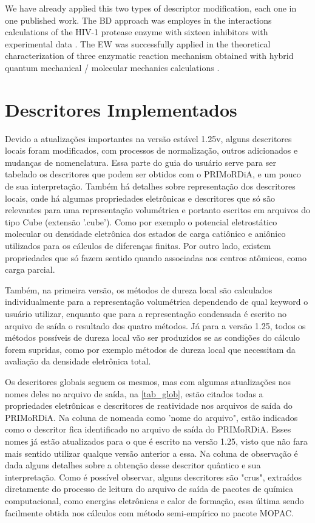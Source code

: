 \documentclass[a4paper,11pt]{refart}
\begin{document}
We have already applied this two types of descriptor modification, each one in one published work. The BD approach was employes in the interactions calculations of the HIV-1 protease enzyme with sixteen inhibitors with experimental data \cite{grillo2020semiempirical}. The EW was successfully applied in the theoretical characterization of three enzymatic reaction mechanism obtained with hybrid quantum mechanical / molecular mechanics calculations \cite{grillo2020elucidating}.

\section{Descritores Implementados} 


Devido a atualizações importantes na versão estável 1.25v, alguns descritores locais foram modificados, com processos de normalização, outros adicionados e mudanças de nomenclatura. Essa parte do guia do usuário serve para ser tabelado os descritores que podem ser obtidos com o PRIMoRDiA, e um pouco de sua interpretação. Também há detalhes sobre representação dos descritores locais, onde há algumas propriedades eletrônicas e descritores que só são relevantes para uma representação volumétrica e portanto escritos em arquivos do tipo Cube (extensão '.cube'). Como por exemplo o potencial eletrostático molecular ou densidade eletrônica dos estados de carga catiônico e aniônico utilizados para os cálculos de diferenças finitas. Por outro lado, existem propriedades que só fazem sentido quando associadas aos centros atômicos, como carga parcial. 

Também, na primeira versão, os métodos de dureza local são calculados individualmente para a representação volumétrica dependendo de qual keyword o usuário utilizar, enquanto que para a representação condensada é escrito no arquivo de saída o resultado dos quatro métodos. Já para a versão 1.25, todos os métodos possíveis de dureza local vão ser produzidos se as condições do cálculo forem supridas, como por exemplo métodos de dureza local que necessitam da avaliação da densidade eletrônica total. 

Os descritores globais seguem os mesmos, mas com algumas atualizações nos nomes deles no arquivo de saída, na \autoref{tab_glob}, estão citados todas a propriedades eletrônicas e descritores de reatividade nos arquivos de saída do PRIMoRDiA. Na coluna de nomeada como 'nome do arquivo", estão indicados como o descritor fica identificado no arquivo de saída do PRIMoRDiA. Esses nomes já estão atualizados para o que é escrito na versão 1.25, visto que não fara mais sentido utilizar qualque versão anterior a essa. Na coluna de observação é dada alguns detalhes sobre a obtenção desse descritor quântico e sua interpretação. Como é possível observar, alguns descritores são "crus", extraídos diretamente do processo de leitura do arquivo de saída de pacotes de química computacional, como energias eletrônicas e calor de formação, essa última sendo facilmente obtida nos cálculos com método semi-empírico no pacote MOPAC.
\end{document}
